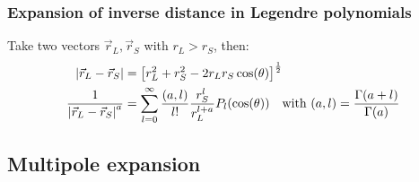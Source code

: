 \subsubsection{Expansion of inverse distance in Legendre polynomials}
Take two vectors $\vec{r}_L , \vec{r}_S$ with $r_L > r_S$, then:
\begin{align*}
    \left\vert \vec{r}_L - \vec{r}_S \right\vert
    &= \left[ r_L^2 + r_S^2 - 2 r_L r_S \cos(\theta) \right]^{\frac{1}{2}}
    \\
    \frac{1}{\left\vert \vec{r}_L - \vec{r}_S \right\vert^a}
    &= \sum_{l=0}^\infty \frac{(a,l)}{l!} \frac{r_S^l}{r_L^{l+a}} P_l (\cos(\theta))
    \hspace{10pt} \text{with } (a,l) = \frac{\Gamma(a+l)}{\Gamma(a)}
\end{align*}

\subsection{Multipole expansion}

